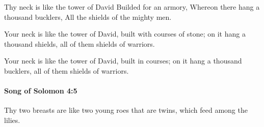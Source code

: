 			\begin{versebox}
					\item[BHS] 
					\item[LXX] 
					\item[ASV] Thy neck is like the tower of David Builded for an armory, Whereon there hang a thousand bucklers, All the shields of the mighty men.
					\item[NIV] Your neck is like the tower of David, built with courses of stone; on it hang a thousand shields, all of them shields of warriors.
					\item[NRSV] Your neck is like the tower of David, built in courses; on it hang a thousand bucklers, all of them shields of warriors.
			\end{versebox}

		\paragraph{Song of Solomon 4:5} %
			\label{SONGOFSOLOMON-4-5}

			Thy two breasts are like two young roes that are twins, which feed among the lilies.

